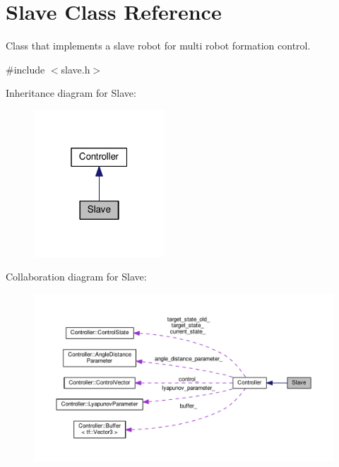 \hypertarget{classSlave}{}\section{Slave Class Reference}
\label{classSlave}


Class that implements a slave robot for multi robot formation control.  




{\ttfamily \#include $<$slave.\+h$>$}



Inheritance diagram for Slave\+:\nopagebreak
\begin{figure}[H]
\begin{center}
\leavevmode
\includegraphics[width=139pt]{classSlave__inherit__graph}
\end{center}
\end{figure}


Collaboration diagram for Slave\+:\nopagebreak
\begin{figure}[H]
\begin{center}
\leavevmode
\includegraphics[width=350pt]{classSlave__coll__graph}
\end{center}
\end{figure}
